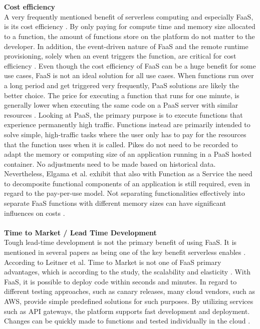 \documentclass[a4paper,11pt, pagesize]{scrartcl}
\begin{document}
\begin{spacing}{1.2}
\\\\ \textbf{Cost efficiency}\\ A very frequently mentioned benefit of serverless computing and especially FaaS, is its cost efficiency \cite{lee2018evaluation}. By only paying for compute time and memory size allocated to a function, the amount of functions store on the platform do not matter to the developer. In addition, the event-driven nature of FaaS and the remote runtime provisioning, solely when an event triggers the function, are critical for cost efficiency \cite{feng2018exploring}. Even though the cost efficiency of FaaS can be a huge benefit for some use cases, FaaS is not an ideal solution for all use cases. When functions run over a long period and get triggered very frequently, PaaS solutions are likely the better choice. The price for executing a function that runs for one minute, is generally lower when executing the same code on a PaaS server with similar resources \cite{jonas2019cloud}. Looking at PaaS, the primary purpose is to execute functions that experience permanently high traffic. Functions instead are primarily intended to solve simple, high-traffic tasks where the user only has to pay for the resources that the function uses when it is called. Pikes do not need to be recorded to adapt the memory or computing size of an application running in a PaaS hosted container. No adjustments need to be made based on historical data. Nevertheless, Elgama et al. exhibit that also with Function as a Service the need to decomposite functional components of an application is still required, even in regard to the pay-per-use model. Not separating functionalities effectively into separate FaaS functions with different memory sizes can have significant influences on costs \cite{elgamal2018costless}.\\\\ \textbf{Time to Market / Lead Time Development}\\ Tough lead-time development is not the primary benefit of using FaaS. It is mentioned in several papers as being one of the key benefit serverless enables \cite{adzic2017serverless} \cite{ast2017self}. According to Leitner et al. Time to Market is not one of FaaS primary advantages, which is according to the study, the scalability and elasticity \cite{leitner2019mixed}. With FaaS, it is possible to deploy code within seconds and minutes. In regard to different testing approaches, such as canary releases, many cloud vendors, such as AWS, provide simple predefined solutions for such purposes. By utilizing services such as API gateways, the platform supports fast development and deployment. Changes can be quickly made to functions and tested individually in the cloud \cite{sewak2018winning}.\\\\

\end{spacing}
\end{document}
